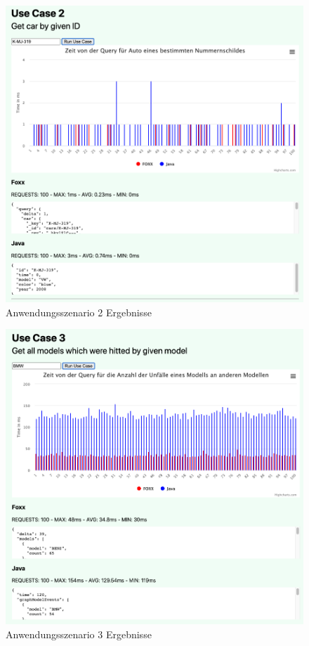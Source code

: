 \begin{figure}[htbp] 
  	\centering
     \includegraphics[width=1\textwidth]{./images/UseCase2.png}
 	\caption{Anwendungsszenario 2 Ergebnisse}
  \label{fig:DataSchema}
\end{figure}
\begin{figure}[htbp] 
  	\centering
     \includegraphics[width=1\textwidth]{./images/UseCase3.png}
 	\caption{Anwendungsszenario 3 Ergebnisse}
  \label{fig:DataSchema}
\end{figure}
